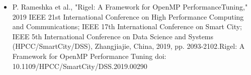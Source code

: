 \smallskip
\begin{itemize}
\item P. Rameshka et al., "Rigel: A Framework for OpenMP PerformanceTuning," 2019 IEEE 21st International Conference on High Performance Computing and Communications; IEEE 17th International Conference on Smart City; IEEE 5th International Conference on Data Science and Systems (HPCC/SmartCity/DSS), Zhangjiajie, China, 2019, pp. 2093-2102.Rigel: A Framework for OpenMP Performance Tuning 
doi: 10.1109/HPCC/SmartCity/DSS.2019.00290
\end{itemize}
